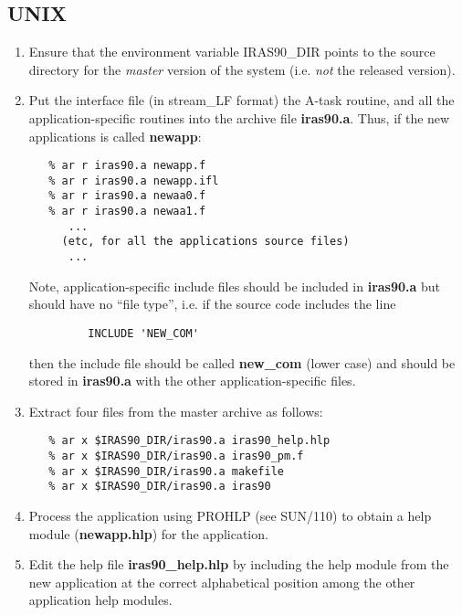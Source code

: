 \subsection{UNIX}
\begin{enumerate}
\item Ensure that the environment variable {\small IRAS90\_DIR} points to the
source directory for the {\em master} version of the system (i.e. {\em not} the
released version).

\item Put the interface file (in stream\_LF format) the A-task routine, and all
the application-specific routines into the archive file {\bf iras90.a}. Thus, if
the new applications is called {\bf newapp}:

\small
\begin{verbatim}
   % ar r iras90.a newapp.f
   % ar r iras90.a newapp.ifl
   % ar r iras90.a newaa0.f
   % ar r iras90.a newaa1.f
      ...
     (etc, for all the applications source files)
      ...
\end{verbatim}
\normalsize

Note, application-specific include files should be included in {\bf iras90.a} but
should have no ``file type'', i.e. if the source code includes the line

\small
\begin{verbatim}
         INCLUDE 'NEW_COM'
\end{verbatim}
\normalsize

then the include file should be called {\bf new\_com} (lower case) and should be
stored in {\bf iras90.a} with the other application-specific files.


\item Extract four files from the master archive as follows:

\small
\begin{verbatim}
   % ar x $IRAS90_DIR/iras90.a iras90_help.hlp
   % ar x $IRAS90_DIR/iras90.a iras90_pm.f
   % ar x $IRAS90_DIR/iras90.a makefile
   % ar x $IRAS90_DIR/iras90.a iras90
\end{verbatim}
\normalsize

\item Process the application using {\small PROHLP} (see SUN/110) to obtain
a help module ({\bf newapp.hlp}) for the application.

\item Edit the help file {\bf iras90\_help.hlp} by including the help module
from the new application at the correct alphabetical position among the other
application help modules.


\end{enumerate}
